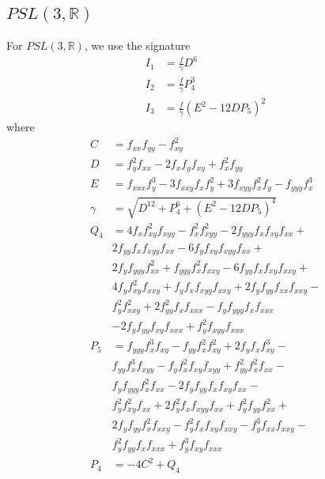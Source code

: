 \documentclass[11pt]{article}
\begin{document}
\subsection{$PSL(3, \mathbb{R})$}
For $PSL(3, \mathbb{R})$, we use the signature
\begin{equation}\label{eq:psl3rsig}
  \begin{split}
    I_1 &= \frac{f}{\gamma}D^6 \\
    I_2 &= \frac{f}{\gamma}P_4^3\\
    I_3 &= \frac{f}{\gamma}(E^2- 12DP_5)^2
  \end{split}
\end{equation}
where
\begin{equation*}
  \begin{split}
    C &= f_{xx}f_{yy} - f_{xy}^2 \\
    D &= f_y^2f_{xx} - 2f_xf_yf_{xy} + f_x^2f_{yy} \\
    E &= f_{xxx}f_y^3 - 3f_{xxy}f_xf_y^2 + 3f_{xyy}f_x^2f_y - f_{yyy}f_x^3
    \\
    \gamma &= \sqrt{D^{12} + P_4^6 + (E^2 - 12DP_5)^4} \\
    Q_4 &= 4f_xf_{xy}^2f_{xyy} - f_x^2f_{xyy}^2 - 2f_{yyy}f_xf_{xy}f_{xx} +
    \\
    & 2f_{yy}f_xf_{xyy}f_{xx} - 6f_yf_{xy}f_{xyy}f_{xx} + \\
    & 2f_yf_{yyy}f_{xx}^2 + f_{yyy}f_x^2f_{xxy} - 6f_{yy}f_xf_{xy}f_{xxy} + \\ 
    & 4f_yf_{xy}^2f_{xxy} + f_yf_xf_{xyy}f_{xxy} + 2f_yf_{yy}f_{xx}f_{xxy} - \\
    & f_y^2f_{xxy}^2 + 2f_{yy}^2f_xf_{xxx} - f_yf_{yyy}f_xf_{xxx} \\
    & -2f_yf_{yy}f_{xy}f_{xxx} + f_y^2f_{xyy}f_{xxx} \\
    P_5 &= f_{yyy}f_x^3f_{xy} - f_{yy}f_x^2f_{xy}^2 + 2f_yf_xf_{xy}^3 - \\
    & f_{yy}f_x^3f_{xyy} - f_yf_x^2f_{xy}f_{xyy} + f_{yy}^2f_x^2f_{xx} - \\
    & f_yf_{yyy}f_x^2f_{xx} - 2f_yf_{yy}f_xf_{xy}f_{xx} - \\
    & f_y^2f_{xy}^2f_{xx} + 2f_y^2f_xf_{xyy}f_{xx} + f_y^2f_{yy}f_{xx}^2 + \\
    & 2f_yf_{yy}f_x^2f_{xxy} - f_y^2f_xf_{xy}f_{xxy} - f_y^3f_{xx}f_{xxy} - \\
    & f_y^2f_{yy}f_xf_{xxx} + f_y^3f_{xy}f_{xxx} \\
    P_4 &= -4C^2 + Q_4 
  \end{split}
\end{equation*}
\end{document}
